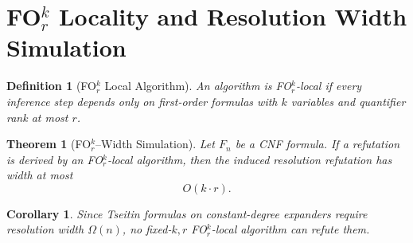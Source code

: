 \documentclass{article}
\newtheorem{definition}{Definition}
\newtheorem{theorem}{Theorem}
\newtheorem{corollary}{Corollary}
\begin{document}
\section{FO$^k_r$ Locality and Resolution Width Simulation}

\begin{definition}[FO$^k_r$ Local Algorithm]
An algorithm is FO$^k_r$-local if every inference step depends only on
first-order formulas with $k$ variables and quantifier rank at most $r$.
\end{definition}

\begin{theorem}[FO$^k_r$–Width Simulation]
Let $F_n$ be a CNF formula.
If a refutation is derived by an FO$^k_r$-local algorithm,
then the induced resolution refutation has width at most
\[
O(k \cdot r).
\]
\end{theorem}

\begin{corollary}
Since Tseitin formulas on constant-degree expanders require
resolution width $\Omega(n)$,
no fixed-$k,r$ FO$^k_r$-local algorithm can refute them.
\end{corollary}
\end{document}
